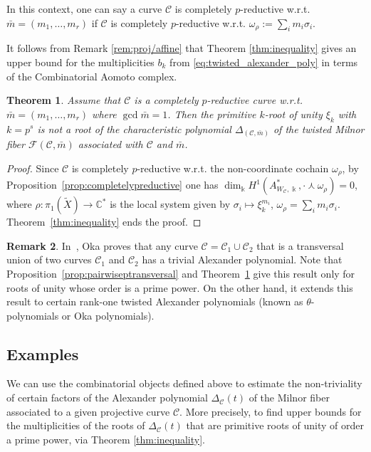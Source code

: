 \documentclass[11pt]{amsart}
\def\cC{\mathcal{C}}
\def\cF{\mathcal{F}}
\def\CC{\mathbb{C}}
\def\kk{\Bbbk}
\def\w{\omega}
\theoremstyle{plain}
\newtheorem{thm}{Theorem}
\theoremstyle{definition}
\newtheorem{remark}[thm]{Remark}
\begin{document}
In this context, one can say a curve $\cC$ is completely $p$-reductive w.r.t. $\bar m=(m_1,\dots,m_r)$ if $\cC$ is completely $p$-reductive w.r.t. 
$\w_\rho := \sum_i m_i \sigma_i$.

It follows from Remark \ref{rem:proj/affine} that Theorem \ref{thm:inequality} gives an upper bound for the multiplicities $b_k$ from \eqref{eq:twisted_alexander_poly} in terms of the Combinatorial Aomoto complex.

\begin{thm}
\label{thm:completelypreductive}
Assume that $\cC$ is a completely $p$-reductive curve w.r.t. $\bar m=(m_1, \ldots ,m_r)$ where $\gcd \bar m=1$.
Then the primitive $k$-root of unity $\xi_k$ with $k=p^s$ is not a root of the characteristic polynomial $\Delta_{(\cC,\bar m)}$ of the twisted Milnor fiber $\cF(\cC,\bar m)$ associated with $\cC$ and $\bar m$.
\end{thm}

\begin{proof}
Since $\cC$ is completely $p$-reductive w.r.t. the non-coordinate cochain $\w_\rho$, by Proposition~\ref{prop:completelypreductive} one has 
$\dim_\kk H^1(A^*_{W_{\cC},\kk},\cdot \curlywedge \w_\rho)=0$, where  
 $\rho:\pi_1(\tilde X)\to \CC^*$ is the local system given by $\sigma_i\mapsto \xi^{m_i}_k$, $\w_\rho = \sum_i m_i \sigma_i$.
Theorem~\ref{thm:inequality} ends the proof.
\end{proof}

\begin{remark}
In~\cite[Theorem 34]{Oka}, Oka proves that any curve $\cC=\cC_1\cup\cC_2$ that is a transversal union of two curves $\cC_1$ and $\cC_2$ has a trivial Alexander polynomial. Note that 
Proposition~\ref{prop:pairwiseptransversal} and Theorem~\ref{thm:completelypreductive} give this result only for roots of unity whose order is a prime power. On the other hand, it extends this result to certain rank-one twisted Alexander polynomials (known as $\theta$-polynomials or Oka polynomials).
\end{remark}

\subsection{Examples}
\label{subsec:milnor}
We can use the combinatorial objects  defined above to estimate the non-triviality of certain factors of the Alexander polynomial $\Delta_{\cC}(t)$ of the Milnor fiber associated to a given projective curve $\cC$. More precisely, to find upper bounds for the multiplicities of the roots of $\Delta_{\cC}(t)$ that are primitive roots of unity of order a prime power, via Theorem \ref{thm:inequality}.
\end{document}
